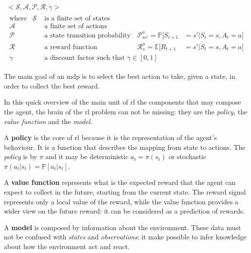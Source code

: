  \begin{gather*} \label{eq:mdp}
 <\mathcal{S}, \mathcal{A}, \mathcal{P}, \mathcal{R}, \gamma>\\
 \begin{aligned}
 	\text{where}\hspace{10pt} \mathcal{S} & \text{ is a finite set of states} \\
 	\mathcal{A} & \text{ a finite set of actions} \\
 	\mathcal{P} & \text{ a state transition probability matrix}
 	& \mathcal{P}_{ss'}^a = \mathbb{P}[S_{t+1}&= s' | S_t = s, A_t = a]\\
 	\mathcal{R} & \text{ a reward function}
 	 	& \mathcal{R}_{s}^a = \mathbb{E}[R_{t+1}&= s' | S_t = s, A_t = a] \\
 	 \gamma & \text{ a discount factor such that } \gamma \in [0,1]
 \end{aligned}
 \end{gather*}


The main goal of an \gls{mdp} is to select the best action to take, given a state, in order to collect the best reward. 


In this quick overview of the main unit of \gls{rl} the components that may compose the agent, the brain of the \gls{rl} problem can not be missing: they are the \textit{policy}, the \textit{value function} and the \textit{model}.

A \textbf{policy} is the core of \gls{rl} because it is the representation of the agent's behaviour. It is a function that describes the mapping from state to actions.  The \textit{policy} is by $\pi$ and it may be deterministic  $a_t = \pi(s_t)$  or stochastic $\pi(a_t|s_t) = \mathbb{P}[a_t | s_t]$.

A \textbf{value function} represents what is the expected reward that the agent can expect to collect in the future, starting from the current state. The reward signal represents only a local value of the reward, while the value function provides a wider view on the future reward: it can be considered as a prediction of rewards.

A \textbf{model} is composed by information about the environment. These data must not be confused with \textit{states} and \textit{observations}: it make possible to infer knowledge about how the environment act and react.





